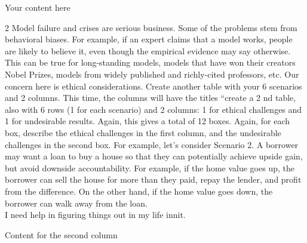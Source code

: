 \documentclass{article}
\begin{document}
Your content here

\begin{multicols}{2}
    Model failure and crises are serious business. Some of the problems stem from
    behavioral biases. For example, if an expert claims that a model works, people are likely
    to believe it, even though the empirical evidence may say otherwise. This can be true
    for long-standing models, models that have won their creators Nobel Prizes, models
    from widely published and richly-cited professors, etc.
    Our concern here is ethical considerations. Create another table with your 6 scenarios
    and 2 columns. This time, the columns will have the titles “create a 2
    nd
    table, also with 6
    rows (1 for each scenario) and 2 columns: 1 for ethical challenges and 1 for undesirable
    results. Again, this gives a total of 12 boxes. Again, for each box, describe the ethical
    challenges in the first column, and the undesirable challenges in the second box.
    For example, let’s consider Scenario 2. A borrower may want a loan to buy a house so
    that they can potentially achieve upside gain, but avoid downside accountability. For
    example, if the home value goes up, the borrower can sell the house for more than they
    paid, repay the lender, and profit from the difference. On the other hand, if the home
    value goes down, the borrower can walk away from the loan. \\

    I need help in figuring things out in my life innit.

\end{multicols} 

Content for the second column
\end{document}
